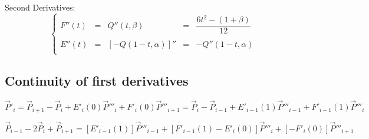 \documentclass[aps,12pt]{revtex4}
\begin{document}
Second Derivatives:
\begin{equation}
\left\lbrace
\begin{array}{rcccl}
	F''(t) & = &Q''(t,\beta) & = & \dfrac{6t^2 - (1+\beta) }{12}\\
	\\
	E''(t) & = &\left[-Q(1-t,\alpha)\right]'' & = & -Q''(1-t,\alpha)\\
\end{array}
\right.
\end{equation}

\subsection{Continuity of first derivatives}

\begin{equation}
	\vec{P}'_i 
	 = \vec{P}_{i+1} - \vec{P}_i + E'_i(0) \vec{P}'''_i + F'_i(0) \vec{P}'''_{i+1} 
	 = \vec{P}_i - \vec{P}_{i-1} + E'_{i-1}(1) \vec{P}'''_{i-1} + F'_{i-1}(1) \vec{P}'''_i
\end{equation}

\begin{equation}
	\vec{P}_{i-1} - 2 \vec{P}_i + \vec{P}_{i+1} 
	=  \left[E'_{i-1}(1)\right] \vec{P}'''_{i-1} + \left[F'_{i-1}(1)- E'_i(0)\right] \vec{P}'''_i + \left[- F'_i(0)\right] \vec{P}'''_{i+1} 
\end{equation}
\end{document}
